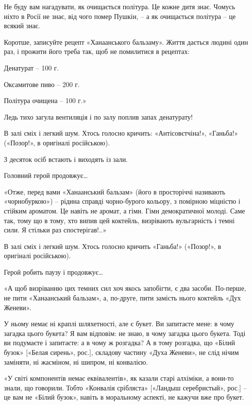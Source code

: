 
Не буду вам нагадувати, як очищається політура. Це кожне дитя знає. Чомусь
ніхто в Росії не знає, від чого помер Пушкін, – а як очищається політура – це
всякий знає.

Коротше, записуйте рецепт «Ханаанського бальзаму». Життя дається людині один
раз, і прожити його треба так, щоб не помилитися в рецептах:

Денатурат – 100 г.

Оксамитове пиво – 200 г.

Політура очищена – 100 г.»

Ледь тихо загула вентиляція і по залу поплив запах денатурату! 

В залі сміх і легкий шум. Хтось голосно кричить: «Антісовєтчіна!», «Ганьба!»
(«Позор!», в оригіналі російською).  

З десяток осіб встають і виходять із зали. 

Головний герой продовжує…

«Отже, перед вами «Ханаанський бальзам» (його в просторіччі називають
«чорнобуркою») – рідина справді чорно-бурого кольору, з помірною міцністю і
стійким ароматом. Це навіть не аромат, а гімн. Гімн демократичної молоді. Саме
так, тому що в тому, хто випив цей коктейль, визрівають вульгарність і темні
сили. Я стільки раз спостерігав!..»

В залі сміх і легкий шум. Хтось голосно кричить «Ганьба!» («Позор!», в
оригіналі російською).  

Герой робить паузу і продовжує…

«А щоб визріванню цих темних сил хоч якось запобігти, є два засоби. По-перше,
не пити «Ханаанський бальзам», а, по-друге, пити замість нього коктейль «Дух
Женеви».

У ньому немає ні краплі шляхетності, але є букет. Ви запитаєте мене: в чому
загадка цього букета? Я вам відповім: не знаю, в чому загадка цього букета.
Тоді ви подумаєте і запитаєте: а в чому ж розгадка? А в тому розгадка, що
«Білий бузок» [«Белая сирень», рос.], складову частину «Духа Женеви», не слід
нічим заміняти, ні жасміном, ні шипром, ні конвалією. 

«У світі компонентів немає еквівалентів», як казали старі алхіміки, а вони-то
знали, що говорили. Тобто «Конвалія срібляста» [«Ландыш серебристый», рос.] –
це вам не «Білий бузок», навіть в моральному аспекті, не кажучи вже про букет.

